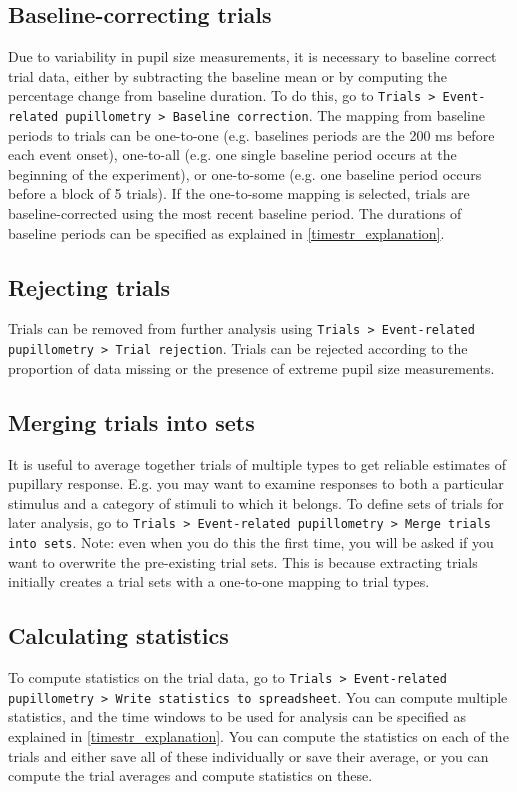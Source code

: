 \documentclass{article}
\newcommand{\erp}{Trials > Event-related pupillometry }
\begin{document}
\subsection{Baseline-correcting trials}
Due to variability in pupil size measurements, it is necessary to baseline correct trial data, either by subtracting the baseline mean or by computing the percentage change from baseline duration. To do this, go to \texttt{\erp > Baseline correction}. The mapping from baseline periods to trials can be one-to-one (e.g. baselines periods are the 200 ms before each event onset), one-to-all (e.g. one single baseline period occurs at the beginning of the experiment), or one-to-some (e.g. one baseline period occurs before a block of 5 trials). If the one-to-some mapping is selected, trials are baseline-corrected using the most recent baseline period. The durations of baseline periods can be specified as explained in \ref{timestr_explanation}.
\subsection{Rejecting trials}
Trials can be removed from further analysis using \texttt{\erp > Trial rejection}. Trials can be rejected according to the proportion of data missing or the presence of extreme pupil size measurements.
\subsection{Merging trials into sets} \label{trialsets}
It is useful to average together trials of multiple types to get reliable estimates of pupillary response. E.g. you may want to examine responses to both a particular stimulus and a category of stimuli to which it belongs. To define sets of trials for later analysis, go to \texttt{\erp > Merge trials into sets}. Note: even when you do this the first time, you will be asked if you want to overwrite the pre-existing trial sets. This is because extracting trials initially creates a trial sets with a one-to-one mapping to trial types.
\subsection{Calculating statistics}
To compute statistics on the trial data, go to \texttt{\erp > Write statistics to spreadsheet}. You can compute multiple statistics, and the time windows to be used for analysis can be specified as explained in \ref{timestr_explanation}. You can compute the statistics on each of the trials and either save all of these individually or save their average, or you can compute the trial averages and compute statistics on these.
\end{document}
